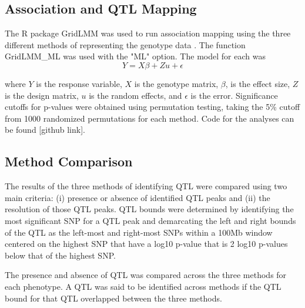 \documentclass[article,9pt,twocolumn,twoside]{rilabRxiv}
\begin{document}
\subsection{Association and QTL Mapping}
The R package GridLMM was used to run association mapping using the three
 different methods of representing the genotype data \citep{RN14}. The function
 GridLMM\_ML was used with the "ML" option. The model for each was
\begin{equation}
\label{eqn:gridlmm}
 Y = X\beta + Zu + \epsilon
\end{equation}

where $Y$ is the response variable, $X$ is the genotype matrix, $\beta$,
is the effect size, $Z$ is the design matrix, $u$ is the random
effects, and $\epsilon$ is the error. Significance cutoffs for p-values were
 obtained using permutation testing, taking the 5\% cutoff from 1000 randomized
  permutations for each method. Code for the analyses can be found [github link].

\subsection{Method Comparison}
The results of the three methods of identifying QTL were compared using two main
criteria: (i) presence or absence of identified QTL peaks and (ii) the resolution
of those QTL peaks. %
QTL bounds were determined by identifying the most significant SNP for a QTL peak and demarcating the left and right bounds of the QTL as the left-most and right-most SNPs within a 100Mb window centered on the highest SNP that have a log10 p-value that is 2 log10 p-values below that of the highest SNP.

The presence and absence of QTL was compared across the three methods for each phenotype. A QTL was said to be identified across methods if the QTL bound for that QTL overlapped between the three methods.
\end{document}
